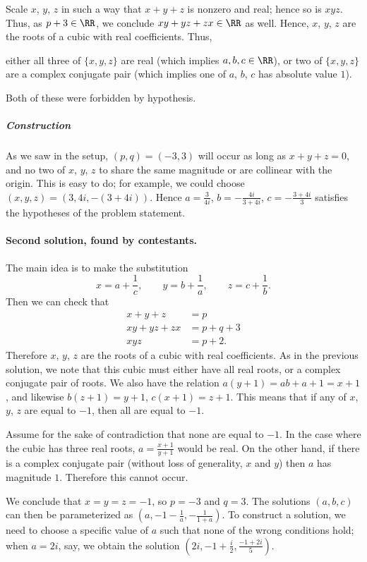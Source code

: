 \documentclass[11pt]{scrartcl}
\begin{document}
Scale $x$, $y$, $z$ in such a way that $x+y+z$ is nonzero and real;
hence so is $xyz$.
Thus, as $p+3 \in \RR$, we conclude $xy+yz+zx \in \RR$ as well.
Hence, $x$, $y$, $z$ are the roots of a cubic with real coefficients.
Thus,
\begin{itemize}
  \ii either all three of $\{x,y,z\}$ are real (which implies $a,b,c \in \RR$),
  \ii or two of $\{x,y,z\}$ are a complex conjugate pair
  (which implies one of $a$, $b$, $c$ has absolute value $1$).
\end{itemize}
Both of these were forbidden by hypothesis.

\subparagraph{Construction}
As we saw in the setup, $(p,q) = (-3,3)$ will occur as long as $x+y+z = 0$,
and no two of $x$, $y$, $z$ to share the same magnitude or are collinear with the origin.
This is easy to do; for example,
we could choose $(x, y, z) = (3, 4i, -(3+4i))$.
Hence $a = \frac{3}{4i}$, $b = -\frac{4i}{3+4i}$, $c = -\frac{3+4i}{3}$
satisfies the hypotheses of the problem statement.

\paragraph{Second solution, found by contestants.}
The main idea is to make the substitution
\[ x=a+\frac{1}{c}, \qquad y=b+\frac{1}{a}, \qquad z=c+\frac{1}{b}. \]
Then we can check that
\begin{align*}
  x+y+z &= p \\
  xy+yz+zx &= p+q+3 \\
  xyz &= p+2.
\end{align*}
Therefore $x$, $y$, $z$ are the roots of a cubic with real coefficients.
As in the previous solution, we note that this cubic must either
have all real roots, or a complex conjugate pair of roots.
We also have the relation $a(y+1)=ab+a+1=x+1$,
and likewise $b(z+1)=y+1$, $c(x+1)=z+1$.
This means that if any of $x$, $y$, $z$ are equal to $-1$,
then all are equal to $-1$.

Assume for the sake of contradiction that none are equal to $-1$.
In the case where the cubic has three real roots,
$a=\frac{x+1}{y+1}$ would be real.
On the other hand, if there is a complex conjugate pair
(without loss of generality, $x$ and $y$) then $a$ has magnitude $1$.
Therefore this cannot occur.

We conclude that $x=y=z=-1$, so $p=-3$ and $q=3$.
The solutions $(a, b, c)$ can then be parameterized
as $(a, -1-\frac{1}{a}, -\frac{1}{1+a})$.
To construct a solution, we need to choose a specific value of $a$ such that
none of the wrong conditions hold;
when $a=2i$, say, we obtain the solution $(2i, -1+\frac{i}{2}, \frac{-1+2i}{5})$.
\end{document}
